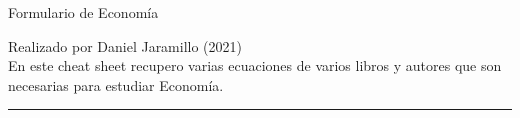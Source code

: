 \documentclass{article}
\begin{document}
\begin{center}{\textsf{\huge{Formulario de Economía}}}
\vspace{0.5cm}

\textsf{Realizado por Daniel Jaramillo (2021)\\ En este cheat sheet recupero varias
ecuaciones de varios libros y autores que son necesarias para estudiar Economía.}

\vspace{0.5cm}
{\color{amaranto} \hrule}
\vspace{0.5cm}
\end{center}
\begin{multicols*}{2}


    
    
    



\end{multicols*}
\end{document}

